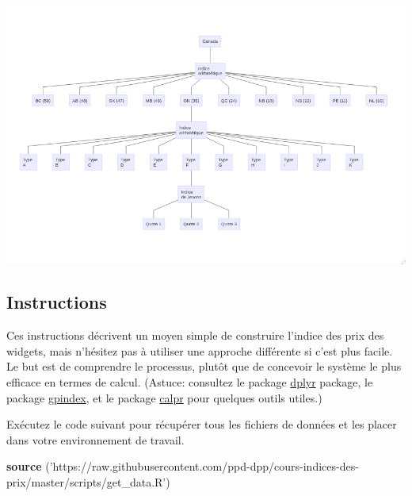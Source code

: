 \documentclass[]{article}
\newenvironment{Shaded}{\begin{snugshade}}{\end{snugshade}}
\newcommand{\KeywordTok}[1]{\textcolor[rgb]{0.13,0.29,0.53}{\textbf{#1}}}
\newcommand{\NormalTok}[1]{#1}
\newcommand{\StringTok}[1]{\textcolor[rgb]{0.31,0.60,0.02}{#1}}
\begin{document}
\includegraphics{img/structure.png}

\hypertarget{instructions}{%
\subsection{Instructions}\label{instructions}}

Ces instructions décrivent un moyen simple de construire l'indice des prix des widgets, mais n'hésitez pas à utiliser une approche différente si c'est plus facile. Le but est de comprendre le processus, plutôt que de concevoir le système le plus efficace en termes de calcul. (Astuce: consultez le package \href{https://cran.r-project.org/package=dplyr}{dplyr} package, le package \href{https://cran.r-project.org/package=gpindex}{gpindex}, et le package \href{https://github.com/ppd-dpp/calpr}{calpr} pour quelques outils utiles.)

Exécutez le code suivant pour récupérer tous les fichiers de données et les placer dans votre environnement de travail.

\begin{Shaded}
\begin{Highlighting}[]
\KeywordTok{source}\NormalTok{ (}\StringTok{'https://raw.githubusercontent.com/ppd-dpp/cours-indices-des-prix/master/scripts/get_data.R'}\NormalTok{)}
\end{Highlighting}
\end{Shaded}
\end{document}
